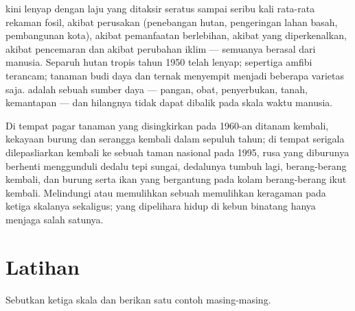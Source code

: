 \begin{proposition}\label{prop:g10:biodiversity-scales:present}
 kini lenyap dengan laju yang ditaksir seratus sampai seribu
kali rata-rata rekaman fosil, akibat perusakan  (penebangan
hutan, pengeringan lahan basah, pembangunan kota), akibat pemanfaatan
berlebihan, akibat  yang diperkenalkan, akibat pencemaran dan
akibat perubahan iklim --- semuanya berasal dari manusia. Separuh hutan
tropis tahun 1950 telah lenyap; sepertiga  amfibi terancam;
 tanaman budi daya dan ternak menyempit menjadi
beberapa varietas saja.  adalah sebuah sumber daya
--- pangan, obat, penyerbukan, tanah, kemantapan  --- dan
hilangnya tidak dapat dibalik pada skala waktu manusia.
\end{proposition}
\admitted

\begin{example}\label{ex:g10:biodiversity-scales:reversing}
Di tempat pagar tanaman yang disingkirkan pada 1960-an ditanam kembali,
kekayaan burung dan serangga kembali dalam sepuluh tahun; di tempat
serigala dilepasliarkan kembali ke sebuah taman nasional pada 1995,
rusa yang diburunya berhenti menggunduli dedalu tepi sungai, dedalunya
tumbuh lagi, berang-berang kembali, dan burung serta ikan yang
bergantung pada kolam berang-berang ikut kembali. Melindungi atau
memulihkan sebuah  memulihkan keragaman pada ketiga skalanya
sekaligus;  yang dipelihara hidup di kebun binatang hanya
menjaga salah satunya.
\end{example}

\section{Latihan}

\begin{exercise}[$\star$]\label{exo:g10:biodiversity-scales:1}
Sebutkan ketiga skala  dan berikan satu contoh masing-masing.
\end{exercise}

